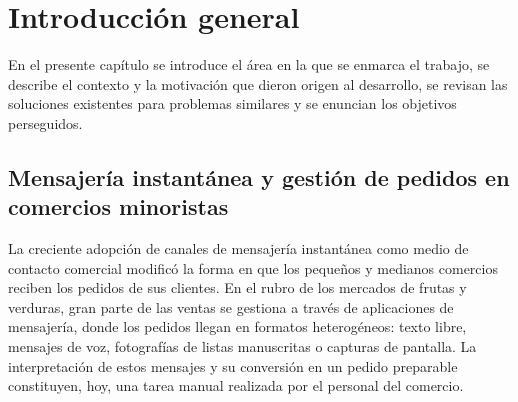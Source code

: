 
\chapter{Introducción general} %

\label{Chapter1} %
\label{IntroGeneral}

En el presente capítulo se introduce el área en la que se enmarca el trabajo, se describe el contexto y la motivación que dieron origen al desarrollo, se revisan las soluciones existentes para problemas similares y se enuncian los objetivos perseguidos.


\newcommand{\keyword}[1]{\textbf{#1}}
\newcommand{\tabhead}[1]{\textbf{#1}}
\newcommand{\code}[1]{\texttt{#1}}
\newcommand{\file}[1]{\texttt{\bfseries#1}}
\newcommand{\option}[1]{\texttt{\itshape#1}}
\newcommand{\grados}{$^{\circ}$}







\section{Mensajería instantánea y gestión de pedidos en comercios minoristas}
\label{sec:intro_general}

La creciente adopción de canales de mensajería instantánea como medio de contacto comercial modificó la forma en que los pequeños y medianos comercios reciben los pedidos de sus clientes. En el rubro de los mercados de frutas y verduras, gran parte de las ventas se gestiona a través de aplicaciones de mensajería, donde los pedidos llegan en formatos heterogéneos: texto libre, mensajes de voz, fotografías de listas manuscritas o capturas de pantalla. La interpretación de estos mensajes y su conversión en un pedido preparable constituyen, hoy, una tarea manual realizada por el personal del comercio.

